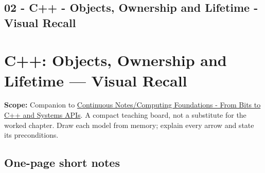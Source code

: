 \hypertarget{appendix-960160274237}{}
\section*{02 - C++ - Objects, Ownership and Lifetime - Visual Recall}
\chapter{C++: Objects, Ownership and Lifetime --- Visual Recall}\label{appendix-960160274237-c-objects-ownership-and-lifetime-visual-recall}

\textbf{Scope:} Companion to \href{Continuous\%20Notes/Computing\%20Foundations\%20-\%20From\%20Bits\%20to\%20C++\%20and\%20Systems\%20APIs}{Continuous Notes/Computing Foundations - From Bits to C++ and Systems APIs}. A compact teaching board, not a substitute for the worked chapter. Draw each model from memory; explain every arrow and state its preconditions.

\section{One-page short notes}\label{appendix-960160274237-one-page-short-notes}

